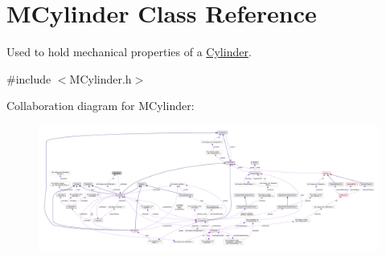 \hypertarget{classMCylinder}{\section{M\+Cylinder Class Reference}
\label{classMCylinder}
}


Used to hold mechanical properties of a \hyperlink{classCylinder}{Cylinder}.  




{\ttfamily \#include $<$M\+Cylinder.\+h$>$}



Collaboration diagram for M\+Cylinder\+:\nopagebreak
\begin{figure}[H]
\begin{center}
\leavevmode
\includegraphics[width=350pt]{classMCylinder__coll__graph}
\end{center}
\end{figure}
